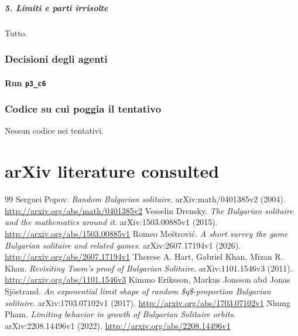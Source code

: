 \documentclass[11pt,a4paper]{article}
\begin{document}
\subparagraph{5. Limiti e parti
irrisolte}\label{limiti-e-parti-irrisolte}

Tutto.

\subsubsection{Decisioni degli agenti}
\paragraph{Run \texttt{p3\_c6}}

\subsubsection{Codice su cui poggia il tentativo}
Nessun codice nei tentativi.

\section{arXiv literature consulted}
\begin{thebibliography}{99}
 Serguei Popov. \emph{Random Bulgarian solitaire}. arXiv:math/0401385v2 (2004). \url{http://arxiv.org/abs/math/0401385v2}
 Vesselin Drensky. \emph{The Bulgarian solitaire and the mathematics around it}. arXiv:1503.00885v1 (2015). \url{http://arxiv.org/abs/1503.00885v1}
 Romeo Meštrović. \emph{A short survey the game Bulgarian solitaire and related games}. arXiv:2607.17194v1 (2026). \url{http://arxiv.org/abs/2607.17194v1}
 Therese A. Hart, Gabriel Khan, Mizan R. Khan. \emph{Revisiting Toom's proof of Bulgarian Solitaire}. arXiv:1101.1546v3 (2011). \url{http://arxiv.org/abs/1101.1546v3}
 Kimmo Eriksson, Markus Jonsson abd Jonas Sjöstrand. \emph{An exponential limit shape of random \$q\$-proportion Bulgarian solitaire}. arXiv:1703.07102v1 (2017). \url{http://arxiv.org/abs/1703.07102v1}
 Nhung Pham. \emph{Limiting behavior in growth of Bulgarian Solitaire orbits}. arXiv:2208.14496v1 (2022). \url{http://arxiv.org/abs/2208.14496v1}
\end{thebibliography}
\end{document}
